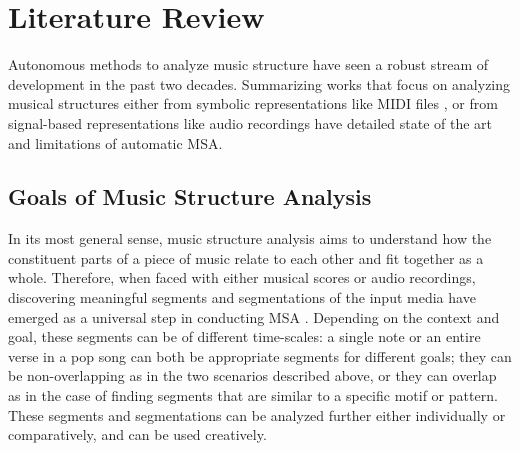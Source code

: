 \section{Literature Review}
Autonomous methods to analyze music structure have seen a robust stream of development in the past two decades.
Summarizing works that focus on analyzing musical structures either from symbolic representations like MIDI files \citep{janssen2013discovering}, or from signal-based representations like audio recordings \citep{nieto2020structure, nieto2015, paulus2010audio} have detailed state of the art and limitations of automatic MSA.

\subsection{Goals of Music Structure Analysis}
In its most general sense, music structure analysis aims to understand how the constituent parts of a piece of music relate to each other and fit together as a whole.
Therefore, when faced with either musical scores or audio recordings, discovering meaningful segments and segmentations of the input media have emerged as a universal step in conducting MSA \citep{janssen2013discovering, nieto2020structure}.
Depending on the context and goal, these segments can be of different time-scales: a single note or an entire verse in a pop song can both be appropriate segments for different goals; they can be non-overlapping as in the two scenarios described above, or they can overlap as in the case of finding segments that are similar to a specific motif or pattern.
These segments and segmentations can be analyzed further either individually or comparatively, and can be used creatively.

